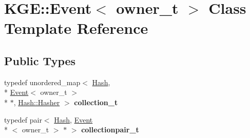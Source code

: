 \hypertarget{class_k_g_e_1_1_event}{\section{K\-G\-E\-:\-:Event$<$ owner\-\_\-t $>$ Class Template Reference}
\label{class_k_g_e_1_1_event}
}
\subsection*{Public Types}
\begin{DoxyCompactItemize}
\item 
\hypertarget{class_k_g_e_1_1_event_abafaf93279c4dab788af267b02e56303}{typedef unordered\-\_\-map$<$ \hyperlink{class_k_g_e_1_1_hash}{Hash}, \\*
\hyperlink{class_k_g_e_1_1_event}{Event}$<$ owner\-\_\-t $>$\\*
 $\ast$, \hyperlink{struct_k_g_e_1_1_hash_1_1_hasher}{Hash\-::\-Hasher} $>$ {\bfseries collection\-\_\-t}}\label{class_k_g_e_1_1_event_abafaf93279c4dab788af267b02e56303}

\item 
\hypertarget{class_k_g_e_1_1_event_abe78630172ef261fcbc6b8fd04e996a8}{typedef pair$<$ \hyperlink{class_k_g_e_1_1_hash}{Hash}, \hyperlink{class_k_g_e_1_1_event}{Event}\\*
$<$ owner\-\_\-t $>$ $\ast$ $>$ {\bfseries collectionpair\-\_\-t}}\label{class_k_g_e_1_1_event_abe78630172ef261fcbc6b8fd04e996a8}

\end{DoxyCompactItemize}
